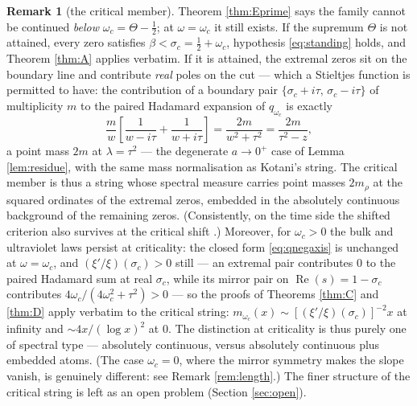 \documentclass[11pt,reqno]{amsart}
\theoremstyle{plain}
\theoremstyle{definition}
\newtheorem{remark}[theorem]{Remark}
\newcommand{\Rp}{\operatorname{Re}}
\begin{document}
\begin{remark}[the critical member]\label{rem:critical}
Theorem \ref{thm:Eprime} says the family cannot be continued \emph{below}
$\omega_c=\Theta-\tfrac12$; at $\omega=\omega_c$ it still exists. If the supremum $\Theta$ is
not attained, every zero satisfies $\beta<\sigma_c=\tfrac12+\omega_c$, hypothesis
\eqref{eq:standing} holds, and Theorem \ref{thm:A} applies verbatim. If it is attained, the
extremal zeros sit on the boundary line and contribute \emph{real} poles on the cut --- which a
Stieltjes function is permitted to have: the contribution of a boundary pair
$\{\sigma_c+i\tau,\,\sigma_c-i\tau\}$ of multiplicity $m$ to the paired Hadamard expansion of
$q_{\omega_c}$ is exactly
\[
  \frac mw\left[\frac1{w-i\tau}+\frac1{w+i\tau}\right]
  =\frac{2m}{w^2+\tau^2}
  =\frac{2m}{\tau^2-z},
\]
a point mass $2m$ at $\lambda=\tau^2$ --- the degenerate $a\to0^+$ case of Lemma
\ref{lem:residue}, with the same mass normalisation as Kotani's string. The critical member is
thus a string whose spectral measure carries point masses $2m_\rho$ at the squared ordinates of
the extremal zeros, embedded in the absolutely continuous background of the remaining zeros.
(Consistently, on the time side the shifted criterion also survives at the critical shift
\cite{Margin}.) Moreover, for $\omega_c>0$ the bulk and ultraviolet laws persist at
criticality: the closed form \eqref{eq:qnegaxis} is unchanged at $\omega=\omega_c$, and
$(\xi'/\xi)(\sigma_c)>0$ still --- an extremal pair contributes $0$ to the paired Hadamard sum
at real $\sigma_c$, while its mirror pair on $\Rp(s)=1-\sigma_c$ contributes
$4\omega_c/(4\omega_c^2+\tau^2)>0$ --- so the proofs of Theorems \ref{thm:C} and \ref{thm:D}
apply verbatim to the critical string:
$m_{\omega_c}(x)\sim[(\xi'/\xi)(\sigma_c)]^{-2}x$ at infinity and $\sim4x/(\log x)^2$ at $0$.
The distinction at criticality is thus purely one of spectral type --- absolutely continuous,
versus absolutely continuous plus embedded atoms. (The case $\omega_c=0$, where the mirror
symmetry makes the slope vanish, is genuinely different: see Remark \ref{rem:length}.) The
finer structure of the critical string is left as an open problem (Section \ref{sec:open}).
\end{remark}
\end{document}
